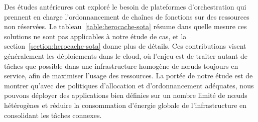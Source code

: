 \begin{table}[!ht]
    \centering
        \caption{État de l'art des plateformes d'orchestration prenant en compte les données}
    \label{table:herocache-sota}
\end{table}

Des études antérieures ont exploré le besoin de plateformes d'orchestration qui prennent en charge l'ordonnancement de chaînes de fonctions sur des ressources non réservées. Le tableau~\ref{table:herocache-sota} résume dans quelle mesure ces solutions ne sont pas applicables à notre étude de cas, et la section~\ref{section:herocache-sota} donne plus de détails. Ces contributions visent généralement les déploiements dans le cloud, où l'enjeu est de traiter autant de tâches que possible dans une infrastructure homogène de nœuds toujours en service, afin de maximiser l'usage des ressources. La portée de notre étude est de montrer qu'avec des politiques d'allocation et d'ordonnancement adéquates, nous pouvons déployer des applications bien définies sur un nombre limité de nœuds hétérogènes et réduire la consommation d'énergie globale de l'infrastructure en consolidant les tâches connexes.

